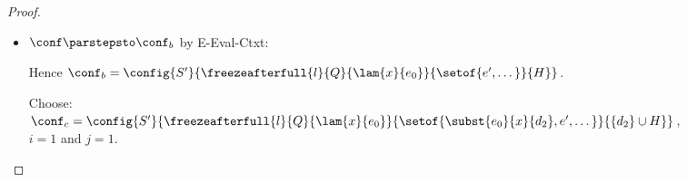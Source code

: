 \begin{proof}
\begin{itemize}
\begin{itemize}
\begin{itemize}
\begin{enumerate}
            The proof is as follows:

            From the premises of {\sc E-Spawn-Handler}, \\
            $S(l) = \state{d_1}{\status_1}$ and
            $d_2 \userleq d_1$ and 
            $d_2 \notin H$ and
            $d_2 \in Q$.

            Therefore, by {\sc E-Spawn-Handler}, \\
            $\config{S}{\freezeafterfull{l}{Q}{\lam{x}{e_0}}{\setof{\subst{e_0}{x}{d'_2},
                  e, \dots}} {\{d'_2\}\cup H}} \parstepsto \\
            \config{S}{\freezeafterfull{l}{Q}{\lam{x}{e_0}}{\setof{\subst{e_0}{x}{d_2}, \subst{e_0}{x}{d'_2},
                  e, \dots}} \setof{d_2} \cup {\{d'_2\}\cup H}}$, \\
            which is equivalent to \\
            $\config{S}{\freezeafterfull{l}{Q}{\lam{x}{e_0}}{\setof{\subst{e_0}{x}{d_2},
                  \subst{e_0}{x}{d'_2}, e, \dots}} {\{d_2, d'_2\}\cup H}}$.

            Hence $\conf_b \parstepsto \conf_c$.
          \end{enumerate}

        \item $d'_2 = d_2$:

          Choose:
          $\conf_c = \config{S}{\freezeafterfull{l}{Q}{\lam{x}{e_0}}{\setof{\subst{e_0}{x}{d_2},
                e, \dots}} {\{d_2\}\cup H}}$, \\
          $i = 0$ and $j = 0$.

          Then
          $\config{S}{\freezeafterfull{l}{Q}{\lam{x}{e_0}}{\setof{\subst{e_0}{x}{d_2},
                e, \dots}} {\{d_2\}\cup H}} = \conf_c$ and $\conf_b =
          \conf_c$, as required.
        \end{itemize}

      \item $\conf \parstepsto \conf_b$ by {\sc E-Eval-Ctxt}:

        Hence $\conf_b =
        \config{S'}{\freezeafterfull{l}{Q}{\lam{x}{e_0}}{\setof{e',
              \dots}}{H}}$.


        Choose: \\
        $\conf_c = \config{S'}{\freezeafterfull{l}{Q}{\lam{x}{e_0}}{\setof{\subst{e_0}{x}{d_2},
              e', \dots}} {\{d_2\}\cup H}}$, \\
        $i = 1$ and $j = 1$.


\end{itemize}
\end{itemize}
\end{proof}
